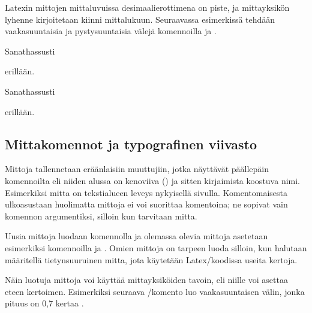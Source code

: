 Latexin mittojen mittaluvuissa desi\-maa\-li\-erot\-ti\-me\-na on piste,
ja mittayksikön lyhenne kirjoitetaan kiinni mittalukuun. Seuraavassa
esimerkissä tehdään vaakasuuntaisia ja pystysuuntaisia välejä
komennoilla  ja .

\pagebreak[3]

\begin{koodilohkosis}
  Sanat\hspace{1.2cm}hassusti
  \vspace{2mm}

  \hspace{1.75em}erillään.
\end{koodilohkosis}

\begin{tulossis}
  Sanat\hspace{1.2cm}hassusti  \nopagebreak
  \vspace{2mm}

  \hspace{1.75em}erillään.
\end{tulossis}

\subsection{Mittakomennot ja typografinen viivasto}

Mittoja tallennetaan eräänlaisiin muuttujiin, jotka näyttävät päällepäin
komennoilta eli niiden alussa on kenoviiva (\koodi{\keno}) ja sitten
kirjaimista koostuva nimi. Esimerkiksi mitta 
on teks\-ti\-alueen leveys nykyisellä sivulla. Komentomaisesta
ulko\-asus\-taan huolimatta mittoja ei voi suorittaa komentoina; ne
sopivat vain komennon argumentiksi, silloin kun tarvitaan mitta.

Uusia mittoja luodaan komennolla  ja olemassa
olevia mittoja asetetaan esimerkiksi komennoilla  ja . Omien mittoja on
tarpeen luoda silloin, kun halutaan määritellä tietynsuuruinen mitta,
jota käytetään Latex\-/koodissa useita kertoja.

\begin{koodilohkosis}
  \newlength{\omamitta}         %
  \setlength{\omamitta}{2.3em}  %
  \addtolength{\omamitta}{1em}  %
  \addtolength{\omamitta}{-1em} %
\end{koodilohkosis}

Näin luotuja mittoja voi käyttää mittayksiköiden tavoin, eli niille voi
asettaa eteen kertoimen. Esimerkiksi seuraava \-/komento luo vaakasuuntaisen välin, jonka pituus on 0,7
kertaa .

